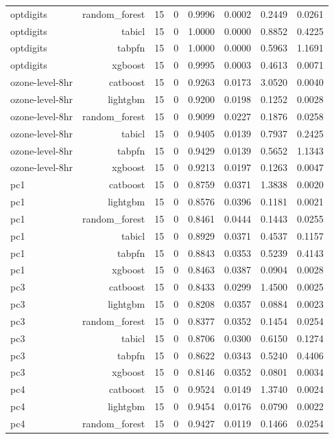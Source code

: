 \begin{table}[htbp]
\begin{tabular}{lrrrrrrr}
optdigits & random\_forest & 15 & 0 & 0.9996 & 0.0002 & 0.2449 & 0.0261 \\
optdigits & tabicl & 15 & 0 & 1.0000 & 0.0000 & 0.8852 & 0.4225 \\
optdigits & tabpfn & 15 & 0 & 1.0000 & 0.0000 & 0.5963 & 1.1691 \\
optdigits & xgboost & 15 & 0 & 0.9995 & 0.0003 & 0.4613 & 0.0071 \\
ozone-level-8hr & catboost & 15 & 0 & 0.9263 & 0.0173 & 3.0520 & 0.0040 \\
ozone-level-8hr & lightgbm & 15 & 0 & 0.9200 & 0.0198 & 0.1252 & 0.0028 \\
ozone-level-8hr & random\_forest & 15 & 0 & 0.9099 & 0.0227 & 0.1876 & 0.0258 \\
ozone-level-8hr & tabicl & 15 & 0 & 0.9405 & 0.0139 & 0.7937 & 0.2425 \\
ozone-level-8hr & tabpfn & 15 & 0 & 0.9429 & 0.0139 & 0.5652 & 1.1343 \\
ozone-level-8hr & xgboost & 15 & 0 & 0.9213 & 0.0197 & 0.1263 & 0.0047 \\
pc1 & catboost & 15 & 0 & 0.8759 & 0.0371 & 1.3838 & 0.0020 \\
pc1 & lightgbm & 15 & 0 & 0.8576 & 0.0396 & 0.1181 & 0.0021 \\
pc1 & random\_forest & 15 & 0 & 0.8461 & 0.0444 & 0.1443 & 0.0255 \\
pc1 & tabicl & 15 & 0 & 0.8929 & 0.0371 & 0.4537 & 0.1157 \\
pc1 & tabpfn & 15 & 0 & 0.8843 & 0.0353 & 0.5239 & 0.4143 \\
pc1 & xgboost & 15 & 0 & 0.8463 & 0.0387 & 0.0904 & 0.0028 \\
pc3 & catboost & 15 & 0 & 0.8433 & 0.0299 & 1.4500 & 0.0025 \\
pc3 & lightgbm & 15 & 0 & 0.8208 & 0.0357 & 0.0884 & 0.0023 \\
pc3 & random\_forest & 15 & 0 & 0.8377 & 0.0352 & 0.1454 & 0.0254 \\
pc3 & tabicl & 15 & 0 & 0.8706 & 0.0300 & 0.6150 & 0.1274 \\
pc3 & tabpfn & 15 & 0 & 0.8622 & 0.0343 & 0.5240 & 0.4406 \\
pc3 & xgboost & 15 & 0 & 0.8146 & 0.0352 & 0.0801 & 0.0034 \\
pc4 & catboost & 15 & 0 & 0.9524 & 0.0149 & 1.3740 & 0.0024 \\
pc4 & lightgbm & 15 & 0 & 0.9454 & 0.0176 & 0.0790 & 0.0022 \\
pc4 & random\_forest & 15 & 0 & 0.9427 & 0.0119 & 0.1466 & 0.0254 \\

\end{tabular}
\end{table}
